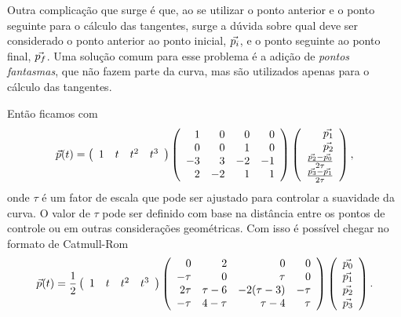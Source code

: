 Outra complicação que surge é que, ao se utilizar o ponto anterior e o ponto seguinte para o cálculo das tangentes, surge a dúvida sobre qual deve ser considerado o ponto anterior ao ponto inicial, ${\vec{p_i}}$, e o ponto seguinte ao ponto final, ${\vec{p_f}}$. Uma solução comum para esse problema é a adição de \textit{pontos fantasmas}, que não fazem parte da curva, mas são utilizados apenas para o cálculo das tangentes.


Então ficamos com
\begin{equation}
    {\vec{p}}(t) =  
        \left(
        \begin{array}{rrrr}
            1 & t & t^2 & t^3
        \end{array}
        \right)
        \left(
        \begin{array}{rrrr}
            1 & 0 & 0 & 0 \\
            0 & 0 & 1 & 0 \\
            -3 & 3 & -2 & -1 \\
                2 & -2 & 1 & 1
        \end{array}
        \right)
    \left(
        \begin{array}{r}
            {\vec{p_1}} \\
            {\vec{p_2}} \\
            \frac{{\vec{p_2}} - {\vec{p_0}}}{2\tau} \\
                \frac{{\vec{p_3}} - {\vec{p_1}}}{2\tau}
        \end{array}
        \right),
\end{equation}
onde $\tau$ é um fator de escala que pode ser ajustado para controlar a suavidade da curva. O valor de $\tau$ pode ser definido com base na distância entre os pontos de controle ou em outras considerações geométricas. Com isso é possível chegar no formato de Catmull-Rom
\begin{equation}
    {\vec{p}}(t) = \frac{1}{2}
       \left(
 	\begin{array}{rrrr}
 		1 & t & t^2 & t^3
 	\end{array}
    \right)
    \left(
 	\begin{array}{rrrr}
 		0 & 2 & 0 & 0 \\
 	    -\tau & 0 & \tau & 0 \\
 		2\tau & \tau-6 & -2(\tau-3) & -\tau \\
            -\tau & 4-\tau & \tau-4 & \tau
 	\end{array}
    \right)
   \left(
 	\begin{array}{r}
 		{\vec{p_0}} \\
 	    {\vec{p_1}} \\
 		{\vec{p_2}} \\
            {\vec{p_3}}
 	\end{array}
    \right).
\end{equation}

